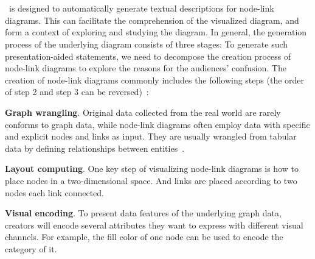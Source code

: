 \section{\ApproachName}
\ApproachName~is designed to automatically generate textual descriptions for node-link diagrams. This can facilitate the comprehension of the visualized diagram, and form a context of exploring and studying the diagram. In general, the generation process of the underlying diagram consists of three stages:
To generate such presentation-aided statements, we need to decompose the creation process of node-link diagrams to explore the reasons for the audiences' confusion.
The creation of node-link diagrams commonly includes the following steps (the order of step 2 and step 3 can be reversed)~\cite{DBLP:journals/cgf/SpritzerBDFF15, tvcg/RomatAP21}:
\begin{compactenum}
    \item \textbf{Graph wrangling}. Original data collected from the real world are rarely conforms to graph data, while node-link diagrams often employ data with specific and explicit nodes and links as input. They are usually wrangled from tabular data by defining relationships between entities~\cite{DBLP:journals/tvcg/SrinivasanPEB18, DBLP:conf/ieeevast/BigelowNML19, DBLP:journals/ivs/HeerP14, DBLP:journals/ivs/LiuNS14}.
    \item \textbf{Layout computing}. One key step of visualizing node-link diagrams is how to place nodes in a two-dimensional space. And links are placed according to two nodes each link connected.
    \item \textbf{Visual encoding}. To present data features of the underlying graph data, creators will encode several attributes they want to express with different visual channels. For example, the fill color of one node can be used to encode the category of it.
\end{compactenum}

